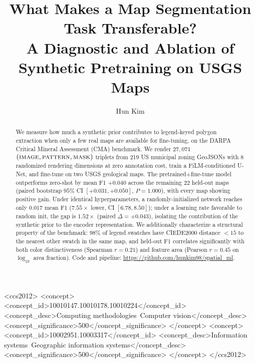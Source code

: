 \documentclass[sigconf,nonacm]{acmart}
\begin{document}
\title{What Makes a Map Segmentation Task Transferable?\\
A Diagnostic and Ablation of Synthetic Pretraining on USGS Maps}

\author{Hun Kim}

\begin{abstract}
We measure how much a synthetic prior contributes to legend-keyed polygon
extraction when only a few real maps are available for fine-tuning, on the
DARPA Critical Mineral Assessment (CMA) benchmark. We render $27{,}071$
$(\textsc{image}, \textsc{pattern}, \textsc{mask})$ triplets from 219 US
municipal zoning GeoJSONs with 8 randomized rendering dimensions at zero
annotation cost, train a FiLM-conditioned U-Net, and fine-tune on two USGS
geological maps. The pretrained$+$fine-tune model outperforms zero-shot by
mean F1 $+0.040$ across the remaining 22 held-out maps (paired bootstrap
$95\%$ CI $[+0.031, +0.050]$, $P{=}1.000$), with every map showing positive
gain. Under identical hyperparameters, a randomly-initialized network
reaches only $0.017$ mean F1 ($7.55\times$ lower, CI $[6.78, 8.50]$); under
a learning rate favorable to random init, the gap is $1.52\times$
(paired $\Delta = +0.043$), isolating the contribution of the synthetic
prior to the encoder representation. We additionally characterize a
structural property of the benchmark: $98\%$ of legend swatches have
CIEDE2000 distance ${<}15$ to the nearest other swatch in the same map,
and held-out F1 correlates significantly with both color distinctiveness
(Spearman $r{=}0.21$) and feature area (Pearson $r{=}0.45$ on $\log_{10}$
area fraction). Code and pipeline:
\url{https://github.com/hunkim98/spatial_ml}.
\end{abstract}

\begin{CCSXML}
<ccs2012>
<concept>
<concept_id>10010147.10010178.10010224</concept_id>
<concept_desc>Computing methodologies~Computer vision</concept_desc>
<concept_significance>500</concept_significance>
</concept>
<concept>
<concept_id>10002951.10003317</concept_id>
<concept_desc>Information systems~Geographic information systems</concept_desc>
<concept_significance>500</concept_significance>
</concept>
</ccs2012>
\end{CCSXML}

\end{document}
